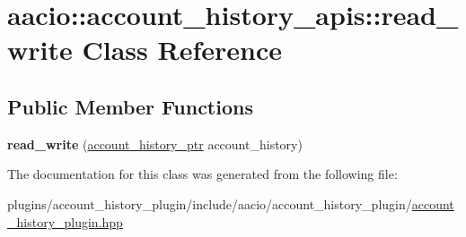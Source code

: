 \hypertarget{classaacio_1_1account__history__apis_1_1read__write}{}\section{aacio\+:\+:account\+\_\+history\+\_\+apis\+:\+:read\+\_\+write Class Reference}
\label{classaacio_1_1account__history__apis_1_1read__write}
\subsection*{Public Member Functions}
\begin{DoxyCompactItemize}
\item 
\mbox{\label{classaacio_1_1account__history__apis_1_1read__write_ad3eecbc2c02d7b00f8d8560fafdf0e5a}} 
{\bfseries read\+\_\+write} (\mbox{\hyperlink{classfc_1_1shared__ptr}{account\+\_\+history\+\_\+ptr}} account\+\_\+history)
\end{DoxyCompactItemize}


The documentation for this class was generated from the following file\+:\begin{DoxyCompactItemize}
\item 
plugins/account\+\_\+history\+\_\+plugin/include/aacio/account\+\_\+history\+\_\+plugin/\mbox{\hyperlink{account__history__plugin_8hpp}{account\+\_\+history\+\_\+plugin.\+hpp}}\end{DoxyCompactItemize}
